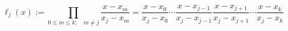 \begin{equation}
  \ell
  _{j}(x):= \prod
  _{0 \leq m \leq k; \quad m \neq j}\frac{x - x_m}{x_j - x_m}= \frac
  {x - x_0}{x_j - x_0}\cdots \frac
  {x -
    x_{j - 1}}{x_j -
    x_{j - 1}}\frac
  {x -
    x_{j + 1}}{x_j -
    x_{j + 1}}\cdots \frac
  {x - x_k}{x_j - x_k}
\end{equation}
